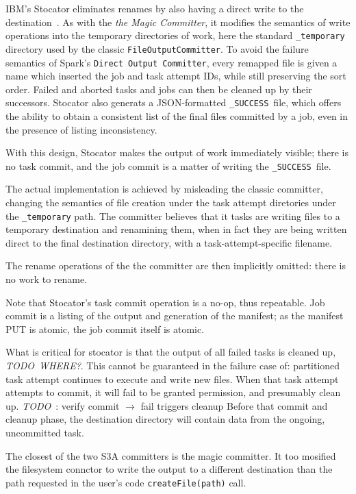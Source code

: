 \documentclass[conference]{IEEEtran}
\newcommand{\SUCCESS}{\texttt{\_SUCCESS}\ }
\newcommand{\TODO}{\emph{TODO}\ }
\begin{document}
IBM's Stocator eliminates renames by also having a direct write to the
destination\ \cite{Stocator}.
As with the \emph{the Magic Committer}, it modifies the semantics of write
operations into the temporary directories of work, here the standard
\texttt{\_temporary} directory used by the classic \texttt{FileOutputCommitter}.
To avoid the failure semantics of Spark's \texttt{Direct Output Committer},
every remapped file is given a name which inserted the job and task attempt IDs,
while still preserving the sort order.
Failed and aborted tasks and jobs can then be cleaned up by their successors.
Stocator also generats a JSON-formatted \SUCCESS file, which offers
the ability to obtain a consistent list of the final files committed by a job,
even in the presence of listing inconsistency.

With this design, Stocator makes the output of work immediately visible;
there is no task commit, and the job commit is a matter of writing
the \SUCCESS file.

The actual implementation is achieved by misleading the classic committer,
changing the semantics of file creation under the task attempt diretories
under the \texttt{\_temporary} path.
The committer believes that it tasks are
 writing files to a temporary destination and renamining them, when
in fact they are being written direct to the final destination directory,
with a task-attempt-specific filename.

The rename operations of the the committer are then implicitly omitted:
there is no work to rename.

Note that Stocator's task commit operation is a no-op, thus repeatable.
Job commit is a listing of the output and generation of the manifest;
as the manifest PUT is atomic, the job commit itself is atomic.

What is critical for stocator is that the output of all failed tasks
is cleaned up, \TODO \emph{WHERE?}.
This cannot be guaranteed in the failure case of: partitioned task attempt
continues to execute and write new files.
When that task attempt attempts to commit, it will fail to be granted permission,
and presumably clean up.
\TODO: verify commit $\rightarrow$ fail triggers cleanup
Before that commit and cleanup phase, the destination directory will contain
data from the ongoing, uncommitted task.

The closest of the two S3A committers is the magic committer.
It too mosified the filesystem connctor to write the output to a
different destination than the path requested
in the user's code \texttt{createFile(path)} call.
\end{document}
